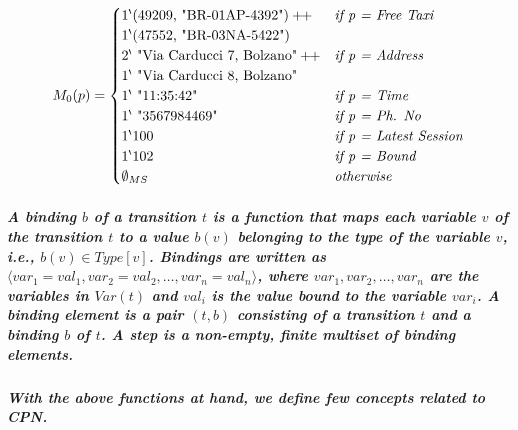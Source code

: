 \begin{equation*}
M_{0}(p) = \begin{cases}
\textnormal{${1}^{\backprime}$(49209,\bdsq{BR-01AP-4392})} +\!\!+  & \textit{if p = Free Taxi}\\
\textnormal{${1}^{\backprime}$(47552,\bdsq{BR-03NA-5422})} & \\
\textnormal{${2}^{\backprime}$\bdsq{Via Carducci 7, Bolzano}} +\!\!+ & \textit{if p = Address}\\ 
\textnormal{${1}^{\backprime}$\bdsq{Via Carducci 8, Bolzano}} & \\
\textnormal{${1}^{\backprime}$\bdsq{11:35:42}} & \textit{if p = Time}\\
\textnormal{${1}^{\backprime}$\bdsq{3567984469}} & \textit{if p = Ph. No}\\
\textnormal{${1}^{\backprime}$100} & \textit{if p = Latest Session}\\
\textnormal{${1}^{\backprime}$102} & \textit{if p = Bound}\\
\emptyset_{MS} & \textit{otherwise}
\end{cases}
\end{equation*}

\subparagraph*{\textnormal{A \textbf{\textit{binding}} $b$ of a transition $t$ is a function that maps each variable $v$ of the transition $t$ to a value $b(v)$ belonging to the type of the variable $v$, i.e., $b(v) \in Type[v]$. Bindings are written as $\langle var_{1} = val_{1},var_{2} = val_{2}, \ldots ,var_{n} = val_{n} \rangle$, where $var_{1}, var_{2}, \ldots , var_{n}$ are the variables in $Var(t)$ and $val_{i}$ is the value bound to the variable $var_{i}$. A \textbf{\textit{binding element}} is a pair $(t,b)$ consisting of a transition $t$ and a binding $b$ of $t$. A step is a non-empty, finite multiset of binding elements.}}

\subparagraph*{\textnormal{With the above functions at hand, we define few concepts related to CPN.}}

